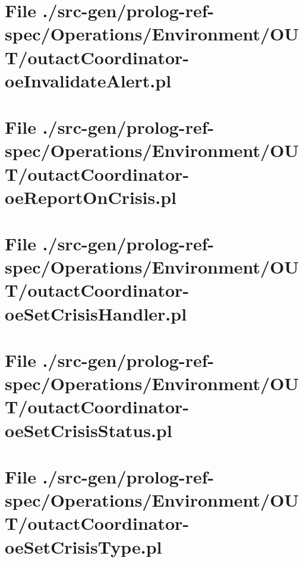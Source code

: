 \section[File /src-gen/prolog-ref-spec.../outactCoordinator-oeInvalidateAlert.pl]{File ./src-gen/prolog-ref-spec/Operations/Environment/OUT/outactCoordinator-oeInvalidateAlert.pl}
\scriptsize

\normalsize
	
\section[File /src-gen/prolog-ref-spec.../outactCoordinator-oeReportOnCrisis.pl]{File ./src-gen/prolog-ref-spec/Operations/Environment/OUT/outactCoordinator-oeReportOnCrisis.pl}
\scriptsize

\normalsize
	
\section[File /src-gen/prolog-ref-spec.../outactCoordinator-oeSetCrisisHandler.pl]{File ./src-gen/prolog-ref-spec/Operations/Environment/OUT/outactCoordinator-oeSetCrisisHandler.pl}
\scriptsize

\normalsize
	
\section[File /src-gen/prolog-ref-spec.../outactCoordinator-oeSetCrisisStatus.pl]{File ./src-gen/prolog-ref-spec/Operations/Environment/OUT/outactCoordinator-oeSetCrisisStatus.pl}
\scriptsize

\normalsize
	
\section[File /src-gen/prolog-ref-spec.../outactCoordinator-oeSetCrisisType.pl]{File ./src-gen/prolog-ref-spec/Operations/Environment/OUT/outactCoordinator-oeSetCrisisType.pl}
\scriptsize

\normalsize
	
